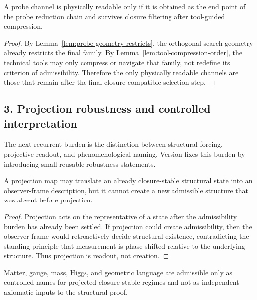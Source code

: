 \begin{proposition}
\label{prop:probe-reduction-principle}
A probe channel is physically readable only if it is obtained as the end point
of the probe reduction chain and survives closure filtering after tool-guided
compression.
\end{proposition}

\begin{proof}
By Lemma~\ref{lem:probe-geometry-restricts}, the orthogonal search geometry
already restricts the final family. By Lemma~\ref{lem:tool-compression-order},
the technical tools may only compress or navigate that family, not redefine its
criterion of admissibility. Therefore the only physically readable channels are
those that remain after the final closure-compatible selection step.
\end{proof}

\subsection*{3. Projection robustness and controlled interpretation}
The next recurrent burden is the distinction between structural forcing,
projective readout, and phenomenological naming. Version  fixes
this burden by introducing small reusable robustness statements.

\begin{lemma}
\label{lem:projection-no-creation}
A projection map may translate an already closure-stable structural state into
an observer-frame description, but it cannot create a new admissible structure
that was absent before projection.
\end{lemma}

\begin{proof}
Projection acts on the representative of a state after the admissibility burden
has already been settled. If projection could create admissibility, then the
observer frame would retroactively decide structural existence, contradicting
the standing principle that measurement is phase-shifted relative to the
underlying structure. Thus projection is readout, not creation.
\end{proof}

\begin{corollary}
\label{cor:interpretation-discipline}
Matter, gauge, mass, Higgs, and geometric language are admissible only as
controlled names for projected closure-stable regimes and not as independent
axiomatic inputs to the structural proof.
\end{corollary}

